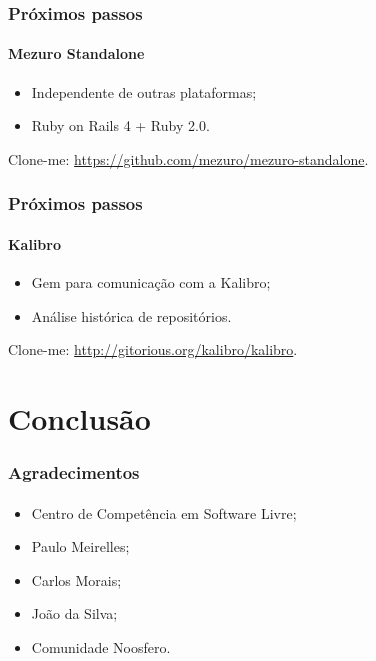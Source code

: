 \documentclass{beamer}
\begin{document}
  \begin{frame}
    \frametitle{Próximos passos}
    \framesubtitle{Mezuro Standalone}
  
    \begin{itemize}
      \item Independente de outras plataformas;
      \item Ruby on Rails 4 + Ruby 2.0.
    \end{itemize}
    
    Clone-me: \url{https://github.com/mezuro/mezuro-standalone}.
  \end{frame}
  
    \begin{frame}
    \frametitle{Próximos passos}
    \framesubtitle{Kalibro}
  
    \begin{itemize}
      \item Gem para comunicação com a Kalibro;
      \item Análise histórica de repositórios.
    \end{itemize}
    
    Clone-me: \url{http://gitorious.org/kalibro/kalibro}.
  \end{frame}
  
  \section{Conclusão}

  \begin{frame}
    \frametitle{Agradecimentos}
    \framesubtitle{}
  
    \begin{itemize}
      \item Centro de Competência em Software Livre;
      \item Paulo Meirelles;
      \item Carlos Morais;
      \item João da Silva;
      \item Comunidade Noosfero.
    \end{itemize}
  \end{frame}
\end{document}
